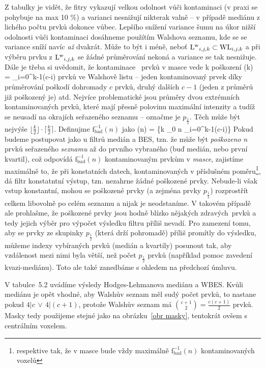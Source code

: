     Z tabulky je vidět, že fitry vykazují velkou odolnost vůči kontaminaci (v praxi se pohybuje na max 10 \%) a varianci nesnižují nikterak valně -- v případě mediánu z lichého počtu prvků dokonce vůbec. Lepšího snížení variance šumu na úkor nižší odolnosti vůči kontaminaci dosáhneme použítím Walshova seznamu, kde se se variance sníží navíc \emph{až} dvakrát. Může to být i méně, neboť ${\mathrm{L^w}_{i,j,k}} \subset {\mathrm{WL}_{i,j,k}}$ a při výběru prvku z ${\mathrm{L^w}_{i,j,k}}$ se žádné průměrování nekoná a variance se tak nesnižuje. Dále je třeba si uvědomit, že kontaminace \kk~prvků v masce vede k poškození
    \beq
    (k) = \sum_{i=0}^{k-1}(c-i)
    \eeq
    prvků ve Walshově listu -- jeden kontaminovaný prvek díky průměrování poškodí dohromady $c$ prvků, druhý dalších $c-1$ (jeden z průměrů již poškozený je) atd. Nejvíce problematické jsou průměry dvou extrémních kontaminovaných prvků, které mají přesně polovinu maximální intenzity a tudíž se neusadí na okrajích seřazeného seznamu -- označme je $p_{\frac{1}{2}}$. Těch může být nejvýše $\lfloor\frac{k}{2}\rfloor\cdot\lceil\frac{k}{2}\rceil$. Definujme $\mathrm{f_{bad}^{-1}}(n)$ jako
    \beq
    (n) = \max\bigg\{k \in \Nn_0 \;\bigg\vert\; n \geq \sum_{i=0}^{k-1}(c-i)\bigg\}
    \eeq
    Pokud budeme postupovat jako u filtrů medián a BES, tzn. že může být \emph{poškozeno} \textit{n} prvků seřazeného \emph{seznamu} až do prvního vybraného (buď medián, nebo první kvartil), což odpovídá $\mathrm{f_{bad}^{-1}}(n)$ kontaminovaným prvkům v \emph{masce}, zajistíme maximálně to, že při konstatních datech, kontaminovaných v příslušném poměru\footnote{respektive tak, že v masce bude vždy maximálně $\mathrm{f_{bad}^{-1}}(n)$ kontaminovaných voxelů}, dá filtr konstatntní výstup, tzn. nezahrne žádné poškozené prvky. Nebude-li však vstup konstantní, mohou se poškozené prvky (a zejména prvky $p_{\frac{1}{2}}$) rozprostřít celkem libovolně po celém seznamu a nijak je neodstaníme. V takovém případě ale prohlašme, že poškozené prvky jsou hodně blízko nějakých \bq zdravých\eq ~prvků a tedy jejich výběr pro výpočet výsledku filtru příliš nevadí. Pro zamezení tomu, aby se prvky ze skupinky $p_{\frac{1}{2}}$ (která drží pohromadě) příliš promítly do výsledku, můžeme indexy vybíraných prvků (medián a kvartily) posunout tak, aby vzdálenost mezi nimi byla větší, než počet $p_{\frac{1}{2}}$ prvků (například pomoc zavedení kvazi-mediánu). Toto ale také zanedbáme s ohledem na předchozí úmluvu.

    V tabulce~5.2 uvádíme výsledy Hodges-Lehmanova mediánu a WBES. Kvůli mediánu je opět vhodné, aby Walshův seznam měl sudý počet prvků, to nastane pokud $4|c \,\vee\, 4|(c+1)$, protože Walshův seznam má ${c+1 \choose 2} = \frac{c(c+1)}{2}$ prvků. Masky tedy použijeme stejné jako na obrázku~\ref{obr masky}, tentokrát ovšem s centrálním voxelem.


